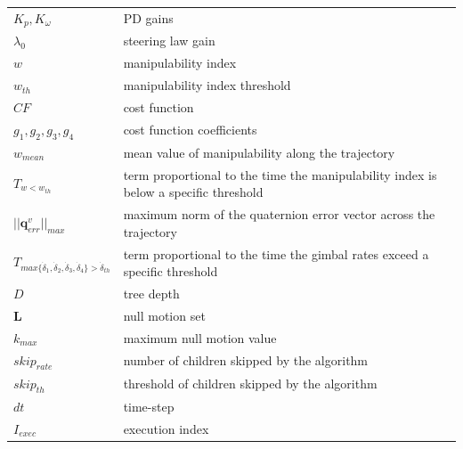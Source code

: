 \documentclass[journal]{new-aiaa}
\begin{document}
{\begin{longtable*}{@{}l @{\quad=\quad} l@{}}
$K_p, K_\omega$ & PD gains\\
$\lambda_0$ & steering law gain\\
$w$ & manipulability index\\
$w_{th}$ & manipulability index threshold\\
$CF$ & cost function \\
$g_1, g_2, g_3, g_4$ & cost function coefficients\\
$w_{mean}$ & mean value of manipulability along the trajectory\\
$T_{w<w_{th}}$ & term proportional to the time the
manipulability index is below a specific threshold\\
$||\textbf{q}_{err}^v||_{max}$ & maximum norm of the quaternion error vector across the trajectory\\
$T_{max\{\dot\delta_1, \dot\delta_2, \dot\delta_3, \dot\delta_4\}>\dot \delta_{th}}$ & term proportional to the time the gimbal rates exceed a specific threshold\\
$D$ & tree depth\\
$\textbf{L}$ &  null motion set\\
$k_{max}$ & maximum null motion value\\
$skip_{rate}$ & number of children skipped by the algorithm\\
$skip_{th}$ & threshold of children skipped by the algorithm \\
$dt$ & time-step\\
$I_{exec}$ & execution index\\
\end{longtable*}}
\end{document}
